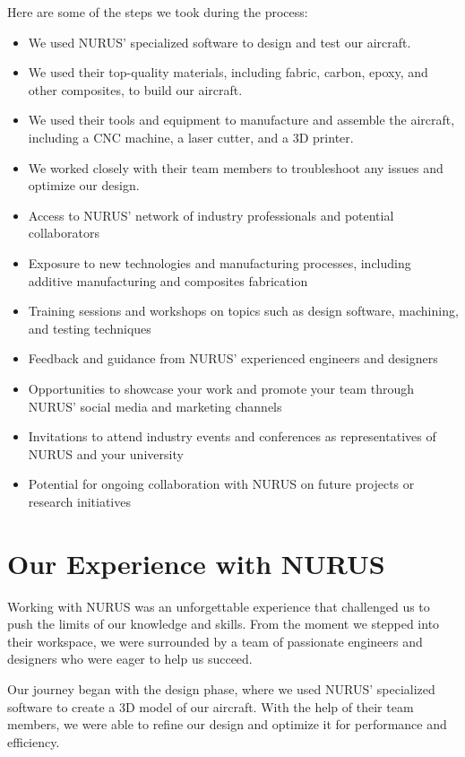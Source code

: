 \documentclass{article}
\begin{document}
Here are some of the steps we took during the process:

\begin{itemize}
    \item We used NURUS' specialized software to design and test our aircraft.
    \item We used their top-quality materials, including fabric, carbon, epoxy, and other composites, to build our aircraft.
    \item We used their tools and equipment to manufacture and assemble the aircraft, including a CNC machine, a laser cutter, and a 3D printer.
    \item We worked closely with their team members to troubleshoot any issues and optimize our design.  
	\item Access to NURUS' network of industry professionals and potential collaborators
	\item Exposure to new technologies and manufacturing processes, including additive manufacturing and composites fabrication
	\item Training sessions and workshops on topics such as design software, machining, and testing techniques
	\item Feedback and guidance from NURUS' experienced engineers and designers
	\item Opportunities to showcase your work and promote your team through NURUS' social media and marketing channels
	\item Invitations to attend industry events and conferences as representatives of NURUS and your university
	\item Potential for ongoing collaboration with NURUS on future projects or research initiatives
\end{itemize}

\section{Our Experience with NURUS}

Working with NURUS was an unforgettable experience that challenged us to push the limits of our knowledge and skills. From the moment we stepped into their workspace, we were surrounded by a team of passionate engineers and designers who were eager to help us succeed.

Our journey began with the design phase, where we used NURUS' specialized software to create a 3D model of our aircraft. With the help of their team members, we were able to refine our design and optimize it for performance and efficiency.
\end{document}
